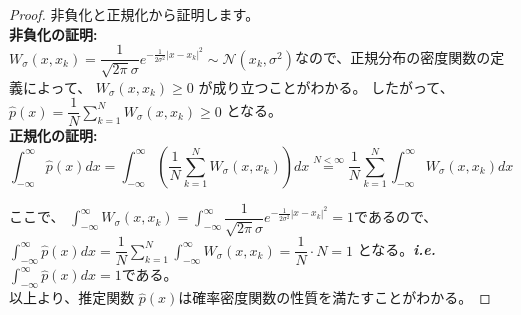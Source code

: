 \documentclass[dvipdfmx,a4paper,12pt]{jarticle}
\makeatletter
\newcommand*{\ie}{\textbf{\textit{i.e.}}\@\xspace}
\theoremstyle{mystyle}
\makeatother
\begin{document}
\begin{proof}
  非負化と正規化から証明します。\\

\noindent
\textbf{\large 非負化の証明:}\\

$W_{\sigma}(x,x_k)=\dfrac{1}{\sqrt{2\pi}\sigma} e^{-\frac{1}{2\sigma^2}|x-x_k|^2} \sim \mathcal{N}(x_k,\sigma^2)$なので、正規分布の密度関数の定義によって、 $ W_{\sigma}(x,x_k) \geq 0$ が成り立つことがわかる。
したがって、 $ \hat{p}(x)=\displaystyle\dfrac{1}{N}\sum_{k=1}^{N}W_{\sigma}(x,x_k) \geq 0 $ となる。\\

\noindent
\textbf{\large 正規化の証明:}\\

\noindent
$$
\int_{-\infty}^{\infty} \hat{p}(x) dx = \int_{-\infty}^{\infty} \left( \dfrac{1}{N}\sum_{k=1}^{N}W_{\sigma}(x,x_k) \right) dx \overset{N<\infty}{=} \dfrac{1}{N}\sum_{k=1}^{N} \int_{-\infty}^{\infty} W_{\sigma}(x,x_k) dx
$$

\noindent
ここで、 $ \displaystyle\int_{-\infty}^{\infty} W_{\sigma}(x,x_k) =\int_{-\infty}^{\infty} \dfrac{1}{\sqrt{2\pi}\sigma}e^{-\frac{1}{2\sigma^2} |x-x_k|^2}=1$であるので、
$ \displaystyle\int_{-\infty}^{\infty} \hat{p}(x) dx=\displaystyle\dfrac{1}{N}\sum_{k=1}^{N}\int_{-\infty}^{\infty}W_{\sigma}(x,x_k)=\dfrac{1}{N}\cdot N= 1$ となる。\ie $\displaystyle\int_{-\infty}^{\infty} \hat{p} (x) dx = 1$である。\\

\noindent
以上より、推定関数 $ \hat{p}(x) $は確率密度関数の性質を満たすことがわかる。
\end{proof}
\end{document}
